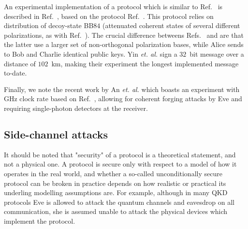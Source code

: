 An experimental implementation of a protocol which is similar to Ref.~\cite{Amiri2016} is described in Ref.~\cite{Yin2017c}, based on the protocol Ref.~\cite{Yin2016}. This protocol relies on distribution of decoy-state BB$84$ (attenuated coherent states of several different polarizations, as with Ref.~\cite{Amiri2016}). The crucial difference betweens Refs.~\cite{Amiri2016} and \cite{Yin2016, Yin2017c} are that the latter use a larger set of non-orthogonal polarization bases, while Alice sends to Bob and Charlie identical public keys. %
Yin \emph{et. al.} \cite{Yin2017c} sign a $32$~bit message over a distance of $102$~km, making their experiment the longest implemented message to-date.

Finally, we note the recent work by An \emph{et. al.} \cite{An2019} which boasts an experiment with GHz clock rate based on Ref.~\cite{Amiri2016}, allowing for coherent forging attacks by Eve and requiring single-photon detectors at the receiver.


\subsection{Side-channel attacks}
It should be noted that "security" of a protocol is a theoretical statement, and not a physical one. A protocol is secure only with respect to a model of how it operates in the real world, and whether a so-called unconditionally secure protocol can be broken in practice depends on how realistic or practical its underling modelling assumptions are. For example, although in many QKD protocols Eve is allowed to attack the quantum channels and eavesdrop on all communication, she is assumed unable to attack the physical devices which implement the protocol. 

